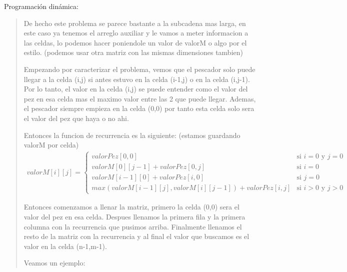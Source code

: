 \textcolor{bibi}{Programación dinámica:} \vspace{.2cm}
\begin{quote}
    De hecho este problema se parece bastante a la subcadena mas larga, en este caso ya tenemos el arreglo auxiliar y le vamos a meter informacion a las celdas, lo podemos hacer poniendole un valor de valorM o algo por el estilo. (podemos usar otra matriz con las mismas dimensiones tambien) \vspace{.2cm}

    Empezando por caracterizar el problema, vemos que el pescador solo puede llegar a la celda (i,j) si antes estuvo en la celda (i-1,j) o en la celda (i,j-1). Por lo tanto, el valor en la celda (i,j) se puede entender como el valor del pez en esa celda mas el maximo valor entre las 2 que puede llegar. Ademas, el pescador siempre empieza en la celda (0,0) por tanto esta celda solo sera el valor del pez que haya o no ahi. \vspace{.2cm}

    Entonces la funcion de recurrencia es la siguiente: (estamos guardando valorM por celda) \vspace{.2cm}
    \begin{align*}
        valorM[i][j]=\begin{cases}
            valorPez[0,0] & \text{si } i=0 \text{ y } j=0 \\
            valorM[0][j-1]+valorPez[0,j] & \text{si } i=0 \\
            valorM[i-1][0]+valorPez[i,0] & \text{si } j=0 \\
            max(valorM[i-1][j],valorM[i][j-1])+valorPez[i,j] & \text{si } i>0 \text{ y } j>0
        \end{cases}
    \end{align*}

    Entonces comenzamos a llenar la matriz, primero la celda (0,0) sera el valor del pez en esa celda. Despues llenamos la primera fila y la primera columna con la recurrencia que pusimos arriba. Finalmente llenamos el resto de la matriz con la recurrencia y al final el valor que buscamos es el valor en la celda (n-1,m-1). \vspace{.2cm}

    Veamos un ejemplo: \vspace{.2cm}


\end{quote}
